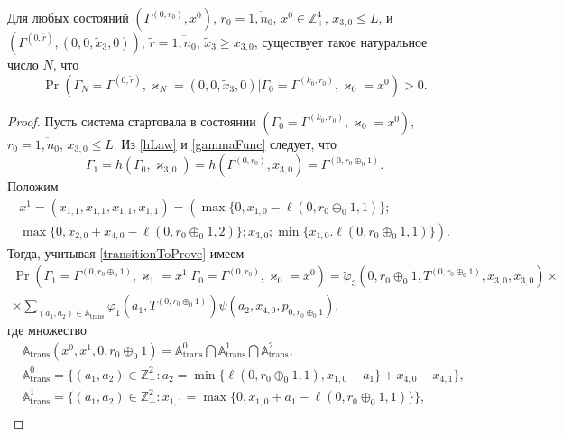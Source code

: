 \documentclass[a4paper,12pt,russian]{extarticle}
\begin{document}
\begin{lemma}
Для любых состояний $(\Gamma^{(0,r_0)},x^0)$, $r_0=\overline{1,n_0}$, $x^0 \in \mathbb{Z}_+^4$, $x_{3,0} \leqslant L$, и $(\Gamma^{(0,\tilde{r})},(0,0,\tilde{x}_3,0))$, $\tilde{r} = \overline{1,n_0}$, $\tilde{x}_3\geqslant x_{3,0}$, существует такое натуральное число $N$, что 
\begin{equation*}
\Pr(\Gamma_{N}=\Gamma^{(0,\tilde{r} )}, \varkappa_{N}=(0,0,\tilde{x}_3,0)|
\Gamma_{0}=\Gamma^{(k_0,r_0)}, \varkappa_{0}=x^0)>0.
\end{equation*}
\label{class:1}
\end{lemma}
\begin{proof}
Пусть система стартовала в состоянии $(\Gamma_{0}=\Gamma^{(k_0,r_0)}, \varkappa_{0}=x^0)$, $r_0=\overline{1,n_0}$, $x_{3,0}\leqslant L$.
Из \eqref{hLaw} и \eqref{gammaFunc} следует, что 
\begin{equation*}
\Gamma_1 = h(\Gamma_0,\varkappa_{3,0}) = h(\Gamma^{(0,r_0)}, x_{3,0}) = \Gamma^{(0,r_0\oplus_{0}1)}.
\end{equation*}
Положим
\begin{multline*}
x^1 =(x_{1,1},x_{1,1},x_{1,1},x_{1,1}) =\left(\max{\{0, x_{1,0} - \ell(0,r_0\oplus_{0}1,1)\}}; \right. \\
\left. \max{\{0, x_{2,0} + x_{4,0}  - \ell(0,r_0\oplus_{0}1,2)\}}; x_{3,0};\min{\{x_{1,0}. \ell(0,r_0\oplus_{0}1,1)\}}\right).
\end{multline*}
Тогда, учитывая \eqref{transitionToProve} имеем
\begin{multline*}
\Pr (\Gamma_{1}=\Gamma^{(0,r_0\oplus_{0}1)},\varkappa_{1}=x^1 | \Gamma_{0}=\Gamma^{(0,r_0)},\varkappa_0=x^0)=\widetilde{\varphi}_3(0,r_0\oplus_{0}1,T^{(0,r_0\oplus_{0}1)},x_{3,0},x_{3,0})\times \\
\times
\sum_{(a_1,a_2)\in {\mathbb A}_{\mathrm{trans}}}\varphi_1(a_1,T^{(0,r_0\oplus_{0}1)})  \psi(a_2,x_{4,0}, p_{0,r_0\oplus_{0}1}),
\end{multline*}
где множество 
\begin{align*}
&{\mathbb A}_{\mathrm{trans}}(x^0,x^1,0,r_0\oplus_{0}1) = {\mathbb A}_{\mathrm{trans}}^0 \bigcap {\mathbb A}_{\mathrm{trans}}^1\bigcap {\mathbb A}_{\mathrm{trans}}^2,\\
&{\mathbb A}_{\mathrm{trans}}^0 = \{(a_1,a_2) \in \mathbb{Z}_+^2 \colon a_2 = \min{\{\ell(0,r_0\oplus_{0}1,1), x_{1,0}+a_1}\} +x_{4,0}-x_{4,1}\},\\
&{\mathbb A}_{\mathrm{trans}}^1 = \{(a_1,a_2) \in \mathbb{Z}_+^2 \colon x_{1,1}=\max{\{0,x_{1,0}+a_1-\ell(0,r_0\oplus_{0}1,1)\}}\},\\

\end{align*}
\end{proof}
\end{document}
